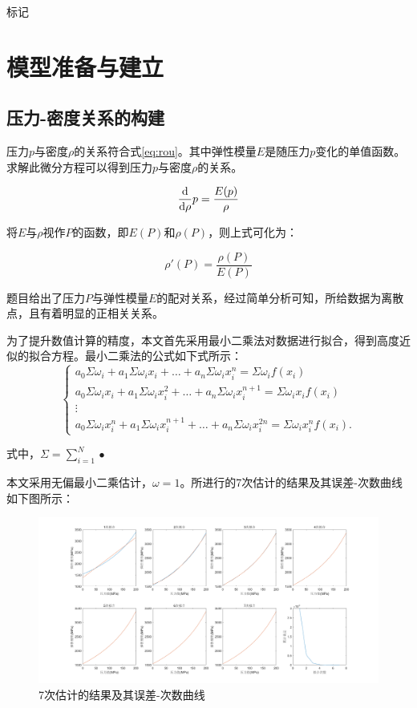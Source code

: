 \documentclass{article}
\newcounter{sub}
\begin{document}
\begin{table}[htpb]
	\centering
	\caption{标记}
	\label{tab:标记}
\end{table}

\section{模型准备与建立}
\subsection{压力-密度关系的构建}
压力$ p $与密度$ \rho $的关系符合式\ref{eq:rou}。其中弹性模量$ E $是随压力$ p $变化的单值函数。求解此微分方程可以得到压力$ p $与密度$ \rho $的关系。

\begin{align}
	\dv{}{\rho}p = \frac{E(p)}{\rho}
	\label{eq:rou}
\end{align}

将$E$与$\rho$视作$P$的函数，即$E(P)$和$\rho(P)$，则上式可化为：

\begin{equation}
	\rho'(P)=\frac{\rho(P)}{E(P)}
\end{equation}

题目给出了压力$P$与弹性模量$E$的配对关系，经过简单分析可知，所给数据为离散点，且有着明显的正相关关系。

为了提升数值计算的精度，本文首先采用最小二乘法对数据进行拟合，得到高度近似的拟合方程。最小二乘法的公式如下式所示：
\begin{equation}
	\left\{
		\begin{array}{ll}
			a_0 \Sigma \omega_i + a_1 \Sigma \omega_i x_i + \ldots +  a_n \Sigma \omega_i x_i^n =\Sigma \omega_i f(x_i) \\
			a_0 \Sigma \omega_i x_i + a_1 \Sigma \omega_i x_i^2 + \ldots +  a_n \Sigma \omega_i x_i^{n+1} =\Sigma \omega_i x_i f(x_i) \\
			\vdots    \\
			a_0 \Sigma \omega_i x_i^n + a_1 \Sigma \omega_i x_i^{n+1} + \ldots +  a_n \Sigma \omega_i x_i^{2n} =\Sigma \omega_i x_i^n f(x_i) .
	\end{array} \right.
\end{equation}

式中，$\Sigma=\sum_{i=1}^N  \bullet $

本文采用无偏最小二乘估计，$\omega=1$。所进行的7次估计的结果及其误差-次数曲线如下图所示：
\begin{figure}[H]
	\centering
	\includegraphics[width=0.9\linewidth]{0-1.png}
	\caption{7次估计的结果及其误差-次数曲线}
	\label{fig:}
\end{figure}
\end{document}
